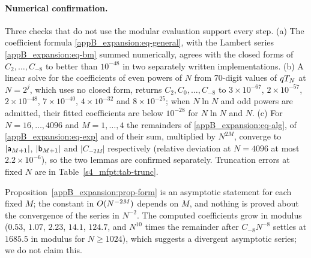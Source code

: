 \paragraph{Numerical confirmation.}
Three checks that do not use the modular evaluation support every step.
(a) The coefficient formula \eqref{appB_expansion:eq-general}, with the Lambert series
\eqref{appB_expansion:eq-bm} summed numerically, agrees with the closed forms of $C_{2},\dots,C_{-8}$ to better than
$10^{-48}$ in two separately written implementations.
(b) A linear solve for the coefficients of even powers of $N$ from 70-digit values of $qT_{N}$ at $N=2^{j}$, which uses
no closed form, returns $C_{2},C_{0},\dots,C_{-8}$ to $3\times10^{-67}$, $2\times10^{-57}$, $2\times10^{-48}$,
$7\times10^{-40}$, $4\times10^{-32}$ and $8\times10^{-25}$; when $N\ln N$ and odd powers are admitted, their fitted
coefficients are below $10^{-28}$ for $N\ln N$ and $N$.
(c) For $N=16,\dots,4096$ and $M=1,\dots,4$ the remainders of \eqref{appB_expansion:eq-alg}, of
\eqref{appB_expansion:eq-exp} and of their sum, multiplied by $N^{2M}$, converge to $|\mathsf{a}_{M+1}|$,
$|\mathsf{b}_{M+1}|$ and $|C_{-2M}|$ respectively (relative deviation at $N=4096$ at most $2.2\times10^{-6}$), so the
two lemmas are confirmed separately.
Truncation errors at fixed $N$ are in Table~\ref{s4_mfpt:tab-trunc}.

\begin{remark}\label{appB_expansion:rem-status}
Proposition~\ref{appB_expansion:prop-form} is an asymptotic statement for each fixed $M$; the constant in
$O(N^{-2M})$ depends on $M$, and nothing is proved about the convergence of the series in $N^{-2}$. The
computed coefficients grow in modulus ($0.53$, $1.07$, $2.23$, $14.1$, $124.7$, and
$N^{10}$ times the remainder after $C_{-8}N^{-8}$ settles at $1685.5$ in modulus for $N\ge1024$), which suggests a divergent
asymptotic series; we do not claim this.
\end{remark}
